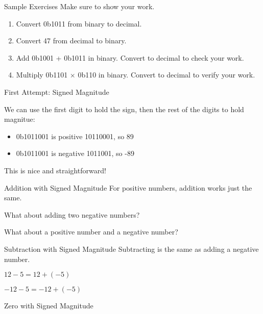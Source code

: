 \begin{frame}{Sample Exercises}
Make sure to show your work.
\vfill 
\begin{enumerate}
    \item Convert 0b1011 from binary to decimal. 
    \vfill
    \item Convert 47 from decimal to binary.
    \vfill
    \item Add 0b1001 + 0b1011 in binary. Convert to decimal to check your work.
    \vfill
    \item Multiply 0b1101 $\times$ 0b110 in binary. Convert to decimal to verify your work.
    \vfill 
\end{enumerate}
\end{frame}



\begin{frame}{First Attempt: Signed Magnitude}

We can use the first digit to hold the sign, then the rest of the digits to hold magnitue:

    \begin{itemize}
        \item 0b1011001 is positive 10110001, so 89
        \item 0b1011001 is negative 1011001, so -89 
    \end{itemize}

This is nice and straightforward!

\end{frame}

\begin{frame}{Addition with Signed Magnitude}
    For positive numbers, addition works just the same. 

    What about adding two negative numbers?

    What about a positive number and a negative number?
\end{frame}


\begin{frame}{Subtraction with Signed Magnitude}
Subtracting is the same as adding a negative number.

$12 - 5 = 12 + (-5)$

$-12 - 5 = -12 + (-5)$

\end{frame}



\begin{frame}{Zero with Signed Magnitude}
\end{frame}

